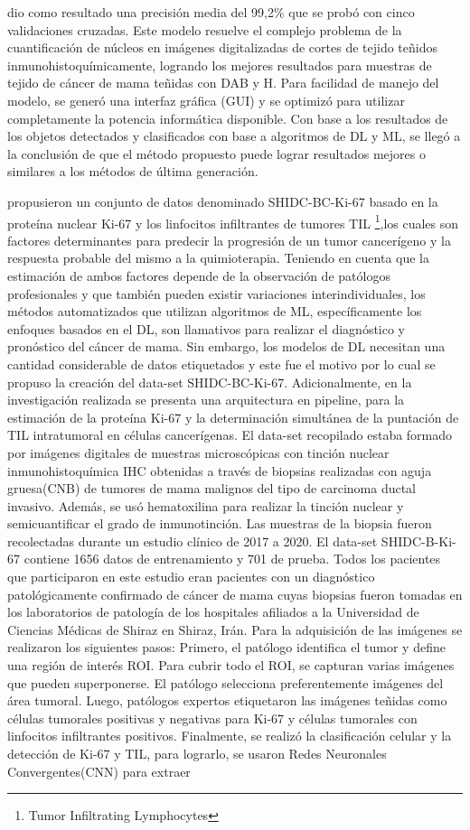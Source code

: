 dio como resultado una precisión media del 99,2\% que se probó con cinco validaciones cruzadas. Este modelo resuelve el complejo problema de la cuantificación de núcleos en imágenes digitalizadas de cortes de tejido teñidos inmunohistoquímicamente, logrando los mejores resultados para muestras de tejido de cáncer de mama teñidas con DAB y H. Para facilidad de manejo del modelo, se generó una interfaz gráfica (GUI) y se optimizó para utilizar completamente la potencia informática disponible. Con base a los resultados de los objetos detectados y clasificados con base a algoritmos de DL y ML, se llegó a la conclusión de que el método propuesto puede lograr resultados mejores o similares a los métodos de última generación. 

\cite{Negahbani2021} propusieron un conjunto de datos denominado SHIDC-BC-Ki-67 basado en la proteína nuclear Ki-67 y los linfocitos infiltrantes de tumores TIL \footnote{Tumor Infiltrating Lymphocytes},los cuales son factores determinantes para predecir la progresión de un tumor cancerígeno y  la respuesta probable del mismo a la quimioterapia. Teniendo en cuenta que la estimación de ambos factores depende de la observación de patólogos profesionales y que también pueden existir variaciones interindividuales, los métodos automatizados que utilizan algoritmos de ML, específicamente los enfoques basados en el DL, son llamativos para realizar el diagnóstico y pronóstico del cáncer de mama. Sin embargo, los modelos de DL necesitan una cantidad considerable de datos etiquetados y este fue el motivo por lo cual se propuso la creación del data-set SHIDC-BC-Ki-67. Adicionalmente, en la investigación realizada se presenta una arquitectura en pipeline, para la estimación de la proteína Ki-67 y la determinación simultánea de la puntación de TIL intratumoral en células cancerígenas. El data-set recopilado estaba formado por imágenes digitales de muestras microscópicas con tinción nuclear inmunohistoquímica IHC obtenidas a través de biopsias realizadas con aguja gruesa(CNB) de tumores de mama malignos del tipo de carcinoma ductal invasivo. Además, se usó hematoxilina para realizar la tinción nuclear y semicuantificar el grado de inmunotinción. Las muestras de la biopsia fueron recolectadas durante un estudio clínico de 2017 a 2020. El data-set SHIDC-B-Ki-67 contiene 1656 datos de entrenamiento y 701 de prueba. Todos los pacientes que participaron en este estudio eran pacientes con un diagnóstico patológicamente confirmado de cáncer de mama cuyas biopsias fueron tomadas en los laboratorios de patología de los hospitales afiliados a la Universidad de Ciencias Médicas de Shiraz en Shiraz, Irán. Para la adquisición de las imágenes se realizaron los siguientes pasos: Primero, el patólogo identifica el tumor y define una región de interés ROI. Para cubrir todo el ROI, se capturan varias imágenes que pueden superponerse. El patólogo selecciona preferentemente imágenes del área tumoral. Luego, patólogos expertos etiquetaron las imágenes teñidas como células tumorales positivas y negativas para Ki-67 y células tumorales con linfocitos infiltrantes positivos. Finalmente, se realizó la clasificación celular y la detección de Ki-67 y TIL, para lograrlo, se usaron Redes Neuronales Convergentes(CNN) para extraer 